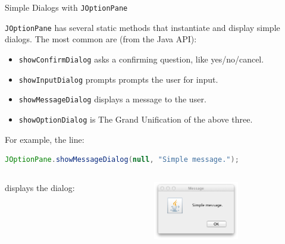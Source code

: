 \documentclass{beamer}
\begin{document}
\begin{frame}[fragile]{Simple Dialogs with {\tt JOptionPane}}


{\tt JOptionPane} has several static methods that instantiate and display simple dialogs.  The most common are (from the Java API):

\begin{itemize}
\item {\tt showConfirmDialog} asks a confirming question, like yes/no/cancel.
\item {\tt showInputDialog} prompts prompts the user for input.
\item {\tt showMessageDialog} displays a message to the user.
\item {\tt showOptionDialog} is The Grand Unification of the above three.
\end{itemize}
For example, the line:
\begin{lstlisting}[language=Java]
JOptionPane.showMessageDialog(null, "Simple message.");
\end{lstlisting}
\begin{columns}[c]
\begin{column}{2in}
displays the dialog:
\end{column}
\begin{column}{2in}
\includegraphics[height=1in]{simple-message-dialog.png}
\end{column}
\end{columns}

\end{frame}
\end{document}
